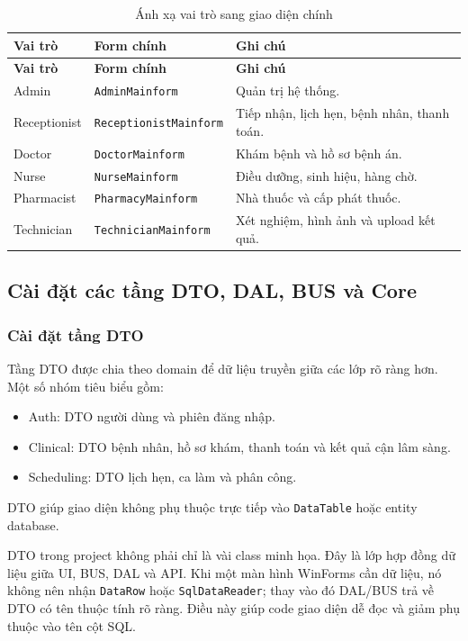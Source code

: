 \documentclass[12pt,a4paper]{article}
\numberwithin{figure}{subsection}
\numberwithin{table}{subsection}
\begin{document}
\begin{longtable}{|p{3.4cm}|p{5cm}|p{5.1cm}|}
\caption{Ánh xạ vai trò sang giao diện chính} \\
\hline
\textbf{Vai trò} & \textbf{Form chính} & \textbf{Ghi chú} \\
\hline
\endfirsthead
\hline
\textbf{Vai trò} & \textbf{Form chính} & \textbf{Ghi chú} \\
\hline
\endhead
Admin & \texttt{AdminMainform} & Quản trị hệ thống. \\
\hline
Receptionist & \texttt{ReceptionistMainform} & Tiếp nhận, lịch hẹn, bệnh nhân, thanh toán. \\
\hline
Doctor & \texttt{DoctorMainform} & Khám bệnh và hồ sơ bệnh án. \\
\hline
Nurse & \texttt{NurseMainform} & Điều dưỡng, sinh hiệu, hàng chờ. \\
\hline
Pharmacist & \texttt{PharmacyMainform} & Nhà thuốc và cấp phát thuốc. \\
\hline
Technician & \texttt{TechnicianMainform} & Xét nghiệm, hình ảnh và upload kết quả. \\
\hline
\end{longtable}

\subsection{Cài đặt các tầng DTO, DAL, BUS và Core}

\subsubsection{Cài đặt tầng DTO}

Tầng DTO được chia theo domain để dữ liệu truyền giữa các lớp rõ ràng hơn. Một số nhóm tiêu biểu gồm:

\begin{itemize}
    \item Auth: DTO người dùng và phiên đăng nhập.
    \item Clinical: DTO bệnh nhân, hồ sơ khám, thanh toán và kết quả cận lâm sàng.
    \item Scheduling: DTO lịch hẹn, ca làm và phân công.
\end{itemize}

DTO giúp giao diện không phụ thuộc trực tiếp vào \texttt{DataTable} hoặc entity database.

DTO trong project không phải chỉ là vài class minh họa. Đây là lớp hợp đồng dữ liệu giữa UI, BUS, DAL và API. Khi một màn hình WinForms cần dữ liệu, nó không nên nhận \texttt{DataRow} hoặc \texttt{SqlDataReader}; thay vào đó DAL/BUS trả về DTO có tên thuộc tính rõ ràng. Điều này giúp code giao diện dễ đọc và giảm phụ thuộc vào tên cột SQL.
\end{document}
